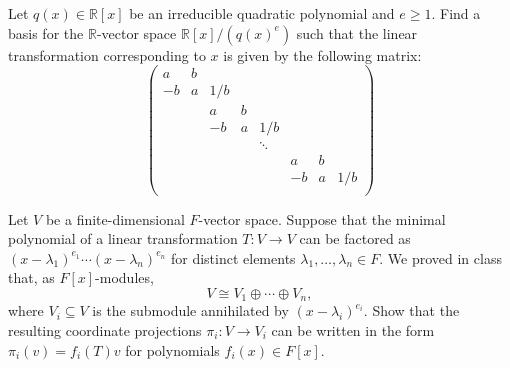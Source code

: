 \documentclass[10pt]{article}
\providecommand{\RR}{\mathbb R}
\begin{document}
\begin{problem}
    Let $q(x)\in\RR[x]$ be an irreducible quadratic polynomial and $e\ge1$.
    Find a basis for the $\RR$-vector space $\RR[x]/(q(x)^e)$
    such that the linear transformation corresponding to $x$
    is given by the following matrix:
    \begin{equation*}
        \begin{pmatrix}
	    a&b\\
	    -b&a&1/b\\
	      & & a&b\\
	      & &-b&a&1/b\\
	      & &  & &\ddots\\
	      & & & & & a&b\\
	      & & & & & -b&a&1/b\\
        \end{pmatrix}
    \end{equation*}
\end{problem}

\begin{problem}
    Let $V$ be a finite-dimensional $F$-vector space.
    Suppose that the minimal polynomial of a linear transformation
    $T\colon V\to V$ can be factored as
    $(x-\lambda_1)^{e_1}\cdots(x-\lambda_n)^{e_n}$
    for distinct elements $\lambda_1,\dots,\lambda_n\in F$.
    We proved in class that, as $F[x]$-modules,
    \begin{equation*}
        V\cong V_1\oplus\cdots\oplus V_n,
    \end{equation*}
    where $V_i\subseteq V$ is the submodule annihilated by $(x-\lambda_i)^{e_i}$.
    Show that the resulting coordinate projections $\pi_i\colon V\to V_i$
    can be written in the form $\pi_i(v) = f_i(T)v$
    for polynomials $f_i(x)\in F[x]$.
\end{problem}
\end{document}
